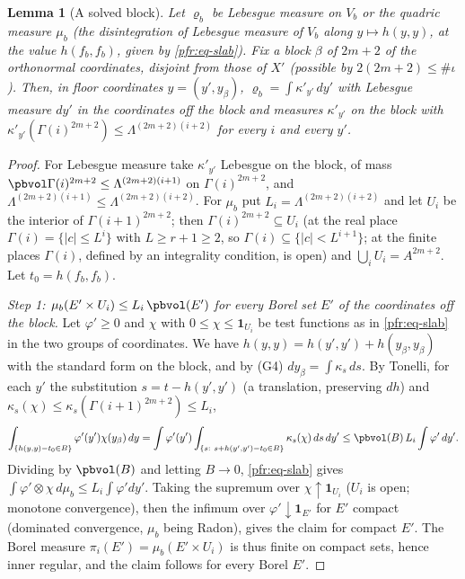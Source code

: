 \documentclass[10pt]{amsart}
\newtheorem{lemma}[theorem]{Lemma}
\theoremstyle{definition}
\theoremstyle{remark}
\begin{document}
\begin{lemma}[A solved block]\label{pfr:block}
Let $\varrho_b$ be Lebesgue measure on $V_b$ or the quadric measure $\mu_b$ (the disintegration of
Lebesgue measure of $V_b$ along $y\mapsto h(y,y)$, at the value $h(f_b,f_b)$, given by \eqref{pfr:eq-slab}). Fix a block $\beta$ of $2m+2$ of
the orthonormal coordinates, disjoint from those of $X'$ (possible by $2(2m+2)\le\#\iota$). Then, in floor
coordinates $y=(y',y_\beta)$, $\varrho_b=\int\kappa'_{y'}\,dy'$ with Lebesgue measure $dy'$ in the coordinates off
the block and measures $\kappa'_{y'}$ on the block with $\kappa'_{y'}(\Gamma(i)^{2m+2})\le\Lambda^{(2m+2)(i+2)}$ for
every $i$ and every $y'$.
\end{lemma}
\begin{proof}
For Lebesgue measure take $\kappa'_{y'}$ Lebesgue on the block, of mass $\pbvol\Gamma(i)^{2m+2}\le\Lambda^{(2m+2)(i+1)}$ on
$\Gamma(i)^{2m+2}$, and $\Lambda^{(2m+2)(i+1)}\le\Lambda^{(2m+2)(i+2)}$. For $\mu_b$ put $L_i=\Lambda^{(2m+2)(i+2)}$ and let
$U_i$ be the interior of $\Gamma(i+1)^{2m+2}$; then $\Gamma(i)^{2m+2}\subseteq U_i$ (at the real place
$\Gamma(i)=\{|c|\le L^i\}$ with $L\ge r+1\ge2$, so $\Gamma(i)\subseteq\{|c|<L^{i+1}\}$; at the finite places $\Gamma(i)$,
defined by an integrality condition, is open) and $\bigcup_iU_i=A^{2m+2}$. Let $t_0=h(f_b,f_b)$.

\emph{Step 1: $\mu_b(E'\times U_i)\le L_i\,\pbvol(E')$ for every Borel set $E'$ of the coordinates off the block.} Let
$\varphi'\ge0$ and $\chi$ with $0\le\chi\le\mathbf 1_{U_i}$ be test functions as in \eqref{pfr:eq-slab} in the two groups
of coordinates. We have $h(y,y)=h(y',y')+h(y_\beta,y_\beta)$ with the standard form on the block, and by (G4)
$dy_\beta=\int\kappa_s\,ds$. By Tonelli, for each $y'$ the substitution $s=t-h(y',y')$ (a translation, preserving $dh$)
and $\kappa_s(\chi)\le\kappa_s(\Gamma(i+1)^{2m+2})\le L_i$,
\[
\int_{\{h(y,y)-t_0\in B\}}\varphi'(y')\chi(y_\beta)\,dy=\int\varphi'(y')\int_{\{s:\ s+h(y',y')-t_0\in B\}}\kappa_s(\chi)\,ds\,dy'
\le\pbvol(B)\,L_i\int\varphi'\,dy'.
\]
Dividing by $\pbvol(B)$ and letting $B\to0$, \eqref{pfr:eq-slab} gives $\int\varphi'\otimes\chi\,d\mu_b\le L_i\int\varphi'dy'$.
Taking the supremum over $\chi\uparrow\mathbf 1_{U_i}$ ($U_i$ is open; monotone convergence), then the infimum over
$\varphi'\downarrow\mathbf 1_{E'}$ for $E'$ compact (dominated convergence, $\mu_b$ being Radon), gives the claim for
compact $E'$. The Borel measure $\pi_i(E')=\mu_b(E'\times U_i)$ is thus finite on compact sets, hence inner regular,
and the claim follows for every Borel $E'$.


\end{proof}
\end{document}
